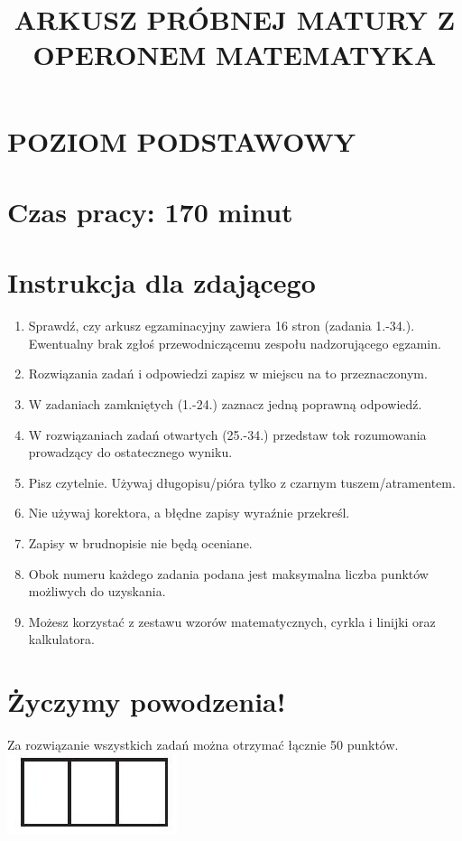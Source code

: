 \documentclass[10pt]{article}
\title{ARKUSZ PRÓBNEJ MATURY Z OPERONEM MATEMATYKA }
\author{}
\date{}
\begin{document}
\maketitle
\section*{POZIOM PODSTAWOWY}
\section*{Czas pracy: 170 minut}
\section*{Instrukcja dla zdającego}
\begin{enumerate}
  \item Sprawdź, czy arkusz egzaminacyjny zawiera 16 stron (zadania 1.-34.). Ewentualny brak zgłoś przewodniczącemu zespołu nadzorującego egzamin.
  \item Rozwiązania zadań i odpowiedzi zapisz w miejscu na to przeznaczonym.
  \item W zadaniach zamkniętych (1.-24.) zaznacz jedną poprawną odpowiedź.
  \item W rozwiązaniach zadań otwartych (25.-34.) przedstaw tok rozumowania prowadzący do ostatecznego wyniku.
  \item Pisz czytelnie. Używaj długopisu/pióra tylko z czarnym tuszem/atramentem.
  \item Nie używaj korektora, a błędne zapisy wyraźnie przekreśl.
  \item Zapisy w brudnopisie nie będą oceniane.
  \item Obok numeru każdego zadania podana jest maksymalna liczba punktów możliwych do uzyskania.
  \item Możesz korzystać z zestawu wzorów matematycznych, cyrkla i linijki oraz kalkulatora.
\end{enumerate}

\section*{Życzymy powodzenia!}
Za rozwiązanie wszystkich zadań można otrzymać łącznie 50 punktów.\\
\includegraphics[max width=\textwidth, center]{2024_11_21_724abc2cf5a71562f5b2g-01(1)}
\end{document}

